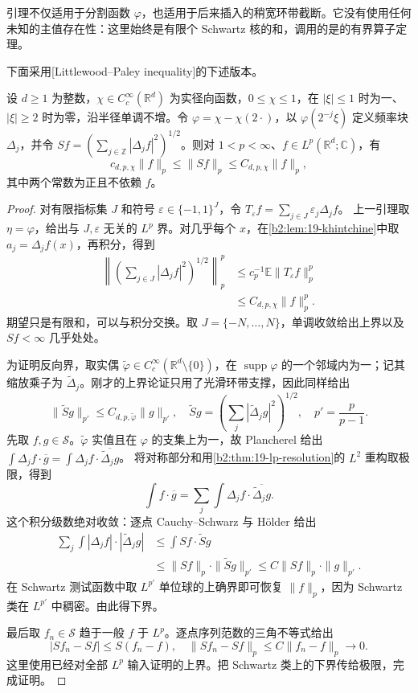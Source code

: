 引理不仅适用于分割函数 \(\varphi\)，也适用于后来插入的稍宽环带截断。它没有使用任何未知的主值存在性：这里始终是有限个 Schwartz 核的和，调用的是的有界算子定理。

下面采用[Littlewood--Paley inequality]的下述版本。
\begin{theorem}\label{b2:thm:19-square-function}
设 \(d\geq1\) 为整数，\(\chi\in C_c^\infty(\mathbb R^d)\) 为实径向函数，\(0\leq\chi\leq1\)，在 \(|\xi|\leq1\) 时为一、\(|\xi|\geq2\) 时为零，沿半径单调不增。令 \(\varphi=\chi-\chi(2\cdot)\)，以 \(\varphi(2^{-j}\xi)\) 定义频率块 \(\Delta_j\)，并令 \(Sf=(\sum_{j\in\mathbb Z}|\Delta_jf|^2)^{1/2}\)。则对 \(1<p<\infty\)、\(f\in L^p(\mathbb R^d;\mathbb C)\)，有
\[
 c_{d,p,\chi}\|f\|_p\leq\|Sf\|_p
 \leq C_{d,p,\chi}\|f\|_p,
\]
其中两个常数为正且不依赖 \(f\)。
\end{theorem}
\begin{proof}
对有限指标集 \(J\) 和符号 \(\varepsilon\in\{-1,1\}^J\)，令
\(T_\varepsilon f=\sum_{j\in J}\varepsilon_j\Delta_jf\)。
上一引理取 \(\eta=\varphi\)，给出与 \(J,\varepsilon\) 无关的 \(L^p\) 界。对几乎每个 \(x\)，在\cref{b2:lem:19-khintchine}中取 \(a_j=\Delta_jf(x)\)，再积分，得到
\[
 \begin{aligned}
 \left\|\left(\sum_{j\in J}|\Delta_jf|^2\right)^{1/2}\right\|_p^p
 &\leq c_p^{-1}\mathbb E\|T_\varepsilon f\|_p^p\\
 &\leq C_{d,p,\chi}\|f\|_p^p.
 \end{aligned}
\]
期望只是有限和，可以与积分交换。取 \(J=\{-N,\ldots,N\}\)，单调收敛给出上界以及 \(Sf<\infty\) 几乎处处。

为证明反向界，取实偶 \(\widetilde\varphi\in C_c^\infty(\mathbb R^d\setminus\{0\})\)，在 \(\operatorname{supp}\varphi\) 的一个邻域内为一；记其缩放乘子为 \(\widetilde\Delta_j\)。刚才的上界论证只用了光滑环带支撑，因此同样给出
\[
 \|\widetilde Sg\|_{p'}\leq C_{d,p,\widetilde\varphi}\|g\|_{p'},
 \quad
 \widetilde Sg=\left(\sum_j|\widetilde\Delta_jg|^2\right)^{1/2},
 \quad p'=\frac p{p-1}.
\]
先取 \(f,g\in\mathcal S\)。\(\widetilde\varphi\) 实值且在 \(\varphi\) 的支集上为一，故 Plancherel 给出
\(\int\Delta_jf\cdot\overline g=\int\Delta_jf\cdot\overline{\widetilde\Delta_jg}\)。
将对称部分和用\cref{b2:thm:19-lp-resolution}的 \(L^2\) 重构取极限，得到
\[
 \int f\cdot\overline g
 =\sum_j\int\Delta_jf\cdot\overline{\widetilde\Delta_jg}.
\]
这个积分级数绝对收敛：逐点 Cauchy--Schwarz 与 Hölder 给出
\[
 \begin{aligned}
 \sum_j\int|\Delta_jf|\cdot|\widetilde\Delta_jg|
 &\leq\int Sf\cdot\widetilde Sg\\
 &\leq\|Sf\|_p\cdot\|\widetilde Sg\|_{p'}
 \leq C\|Sf\|_p\cdot\|g\|_{p'}.
 \end{aligned}
\]
在 Schwartz 测试函数中取 \(L^{p'}\) 单位球的上确界即可恢复 \(\|f\|_p\)，因为 Schwartz 类在 \(L^{p'}\) 中稠密。由此得下界。

最后取 \(f_n\in\mathcal S\) 趋于一般 \(f\) 于 \(L^p\)。逐点序列范数的三角不等式给出
\[
 |Sf_n-Sf|\leq S(f_n-f),
 \quad
 \|Sf_n-Sf\|_p\leq C\|f_n-f\|_p\longrightarrow0.
\]
这里使用已经对全部 \(L^p\) 输入证明的上界。把 Schwartz 类上的下界传给极限，完成证明。
\end{proof}

